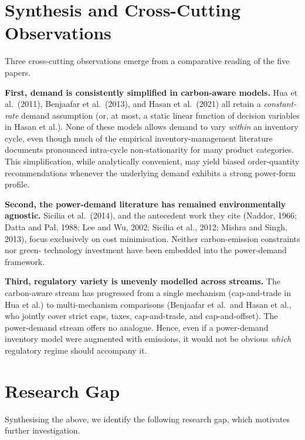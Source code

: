 \documentclass[11pt,a4paper]{article}
\begin{document}
\section{Synthesis and Cross-Cutting Observations}

Three cross-cutting observations emerge from a comparative reading of
the five papers.

\textbf{First, demand is consistently simplified in carbon-aware
models.} Hua et al.\ (2011), Benjaafar et al.\ (2013), and Hasan et al.\
(2021) all retain a \emph{constant-rate} demand assumption (or, at most,
a static linear function of decision variables in Hasan et al.). None of
these models allows demand to vary \emph{within} an inventory cycle,
even though much of the empirical inventory-management literature
documents pronounced intra-cycle non-stationarity for many product
categories. This simplification, while analytically convenient, may
yield biased order-quantity recommendations whenever the underlying
demand exhibits a strong power-form profile.

\textbf{Second, the power-demand literature has remained
environmentally agnostic.} Sicilia et al.\ (2014), and the antecedent
work they cite (Naddor, 1966; Datta and Pal, 1988; Lee and Wu, 2002;
Sicilia et al., 2012; Mishra and Singh, 2013), focus exclusively on
cost minimisation. Neither carbon-emission constraints nor green-
technology investment have been embedded into the power-demand framework.

\textbf{Third, regulatory variety is unevenly modelled across
streams.} The carbon-aware stream has progressed from a single mechanism
(cap-and-trade in Hua et al.) to multi-mechanism comparisons (Benjaafar
et al.\ and Hasan et al., who jointly cover strict caps, taxes,
cap-and-trade, and cap-and-offset). The power-demand stream offers no
analogue. Hence, even if a power-demand inventory model were augmented
with emissions, it would not be obvious \emph{which} regulatory regime
should accompany it.

\section{Research Gap}

Synthesising the above, we identify the following research gap, which
motivates further investigation.
\end{document}
